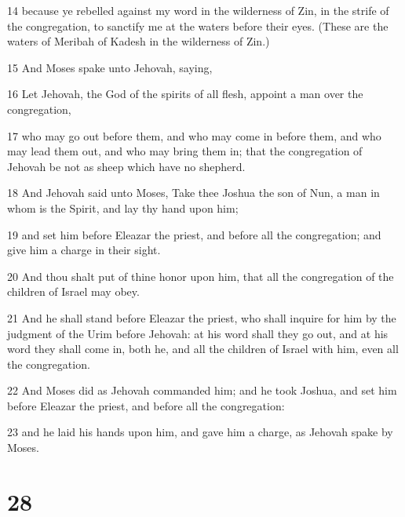 \par 14 because ye rebelled against my word in the wilderness of Zin, in the strife of the congregation, to sanctify me at the waters before their eyes. (These are the waters of Meribah of Kadesh in the wilderness of Zin.)
\par 15 And Moses spake unto Jehovah, saying,
\par 16 Let Jehovah, the God of the spirits of all flesh, appoint a man over the congregation,
\par 17 who may go out before them, and who may come in before them, and who may lead them out, and who may bring them in; that the congregation of Jehovah be not as sheep which have no shepherd.
\par 18 And Jehovah said unto Moses, Take thee Joshua the son of Nun, a man in whom is the Spirit, and lay thy hand upon him;
\par 19 and set him before Eleazar the priest, and before all the congregation; and give him a charge in their sight.
\par 20 And thou shalt put of thine honor upon him, that all the congregation of the children of Israel may obey.
\par 21 And he shall stand before Eleazar the priest, who shall inquire for him by the judgment of the Urim before Jehovah: at his word shall they go out, and at his word they shall come in, both he, and all the children of Israel with him, even all the congregation.
\par 22 And Moses did as Jehovah commanded him; and he took Joshua, and set him before Eleazar the priest, and before all the congregation:
\par 23 and he laid his hands upon him, and gave him a charge, as Jehovah spake by Moses.

\chapter{28}

